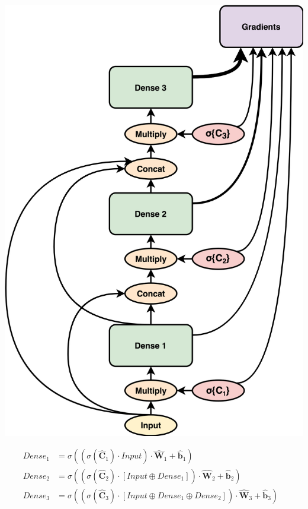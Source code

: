 \documentclass{article}
\let\oldhat\hat
\renewcommand{\hat}[1]{\oldhat{\mathbf{#1}}}
\begin{document}
\noindent\begin{minipage}{.45\textwidth}
   \centering
   \includegraphics[scale=0.09]{DSC.png}
   \label{fig:DSC.png}
\end{minipage}
\begin{minipage}{.45\textwidth}
\begin{equation}
\label{eq:3}
\begin{aligned}
   Dense_{1} &= \sigma((\sigma(\hat{C}_{1}) \cdot Input) \cdot \hat{W}_{1} + \hat{b}_{1}) &\\
   Dense_{2} &= \sigma((\sigma(\hat{C}_{2}) \cdot [Input \oplus Dense_{1}]) \cdot \hat{W}_{2} + \hat{b}_{2}) &\\
   Dense_{3} &= \sigma((\sigma(\hat{C}_{3}) \cdot [Input \oplus Dense_{1} \oplus Dense_{2}]) \cdot \hat{W}_{3} + \hat{b}_{3}) 
\end{aligned}
\end{equation}
\end{minipage}
\end{document}
